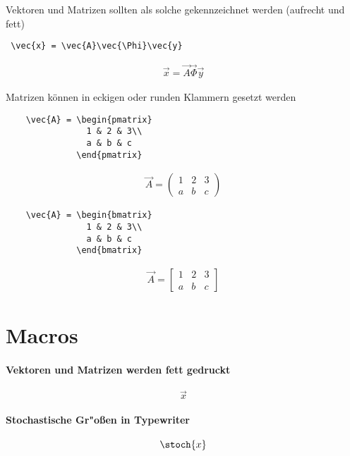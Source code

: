 Vektoren und Matrizen sollten als solche gekennzeichnet werden (aufrecht und fett)
\begin{verbatim}
 \vec{x} = \vec{A}\vec{\Phi}\vec{y}
\end{verbatim}

\begin{align}
    \vec{x} = \vec{A}\vec{\Phi}\vec{y}
\end{align}

Matrizen können in eckigen oder runden Klammern gesetzt werden
\begin{verbatim}
    \vec{A} = \begin{pmatrix}
                1 & 2 & 3\\
                a & b & c
              \end{pmatrix}
\end{verbatim}
\begin{align*}
    \vec{A} = \begin{pmatrix}
                  1 & 2 & 3\\
                  a & b & c
    \end{pmatrix}
\end{align*}
\begin{verbatim}
    \vec{A} = \begin{bmatrix}
                1 & 2 & 3\\
                a & b & c
              \end{bmatrix}
\end{verbatim}
\begin{align*}
    \vec{A} = \begin{bmatrix}
                  1 & 2 & 3\\
                  a & b & c
    \end{bmatrix}
\end{align*}


\section{Macros}
\paragraph{Vektoren und Matrizen werden fett gedruckt}
$$\vec{x}$$

\paragraph{Stochastische Gr"o{\ss}en in Typewriter}
$$\stoch{x}$$



